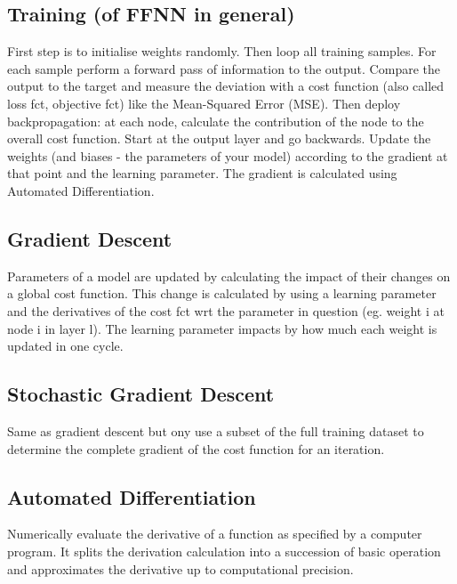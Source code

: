 \subsection{Training (of FFNN in general)}
First step is to initialise weights randomly. Then loop all training samples.
For each sample perform a forward pass of information to the output. Compare the
output to the target and measure the deviation with a cost function (also called
loss fct, objective fct) like the Mean-Squared Error (MSE). Then deploy
backpropagation: at each node, calculate the contribution of the node to the
overall cost function. Start at the output layer and go backwards. Update the
weights (and biases - the parameters of your model) according to the gradient at
that point and the learning parameter. The gradient is calculated using
Automated Differentiation.

\subsection{Gradient Descent}
Parameters of a model are updated by calculating the impact of their changes on
a global cost function. This change is calculated by using a learning parameter
and the derivatives of the cost fct wrt the parameter in question (eg. weight i
at node i in layer l). The learning parameter impacts by how much each weight is
updated in one cycle.

\subsection{Stochastic Gradient Descent}
Same as gradient descent but ony use a subset of the full training dataset to
determine the complete gradient of the cost function for an iteration.

\subsection{Automated Differentiation}
Numerically evaluate the derivative of a function as specified by a computer
program. It splits the derivation calculation into a succession of basic
operation and approximates the derivative up to computational precision.

